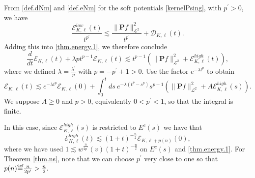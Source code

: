 \documentclass{amsart}
\numberwithin{equation}{section}
\begin{document}
From \eqref{def.dNm} and \eqref{def.eNm} for the 
soft potentials \eqref{kernelPsing}, with $p^\prime>0$, we have
\begin{equation}
\frac{{\mathcal{E}}_{{K},{\ell}}^{low}(t)}{ t^{p^\prime} }\lesssim \frac{\|{\mathbf{P}} {f}\|_{{\mathcal{L}}^2}^2}{ t^{p^\prime} }+  {\mathcal{D}}_{{K},{\ell}}(t).
\label{soft.up.d}
\end{equation}
Adding this into \eqref{thm.energy.1}, we therefore conclude 
\begin{equation*}
\frac{d}{dt}{\mathcal{E}}_{{K},{\ell}}(t)
+
\lambda p t^{p-1} {\mathcal{E}}_{{K},{\ell}}(t)
\lesssim
t^{p-1}
\left(
\|{\mathbf{P}} {f}\|_{{\mathcal{L}}^2}^2
+
 {\mathcal{E}}_{{K},{\ell}}^{high}(t)
 \right),
\end{equation*}
where we defined $\lambda= \frac{{\lambda}^\prime}{ p } $ with $p= -p^\prime+1>0$.  Use the factor $e^{-\lambda t^{p}}$ to obtain
\begin{equation}
{\mathcal{E}}_{{K},{\ell}}(t) 
\lesssim
e^{-\lambda t^{p}}{\mathcal{E}}_{{K},{\ell}}(0) +   
\int_0^t 
ds ~ e^{-\lambda (t^{p}-s^p)}
s^{p-1}
\left( 
\|{\mathbf{P}} {f}\|_{{\mathcal{L}}^2}^2
+
{A}  {\mathcal{E}}_{{K},{\ell}}^{high}(s)
\right).
\label{main.gs.split}
\end{equation}
We suppose ${A}\ge 0$ and $p>0$, equivalently $0< p^\prime<1$,  so that the integral is finite. 

In this case, 
since ${\mathcal{E}}_{{K},{\ell}}^{high}(s)$ is restricted to $E^c(s)$  we have that
\begin{equation}
\label{decay.high}
{\mathcal{E}}_{{K},{\ell}}^{high}(t)
\lesssim
(1+t)^{-\frac{n}{2}} {\mathcal{E}}_{{K},{\ell}+{p({n})}}(0),
\end{equation}
where we have used 
$
1  \lesssim w^{\frac{n}{2p^\prime}}(v) (1+t)^{-\frac{n}{2}}
$
on $E^c(s)$ and \eqref{thm.energy.1}.  For Theorem \ref{thm.ns}, note that we can choose
$
p^\prime
$
very close to one so that 
$
{p({n})} {\overset{\mbox{\tiny{def}}}{=}} \frac{n}{2p^\prime} > \frac{n}{2}.
$
\end{document}

